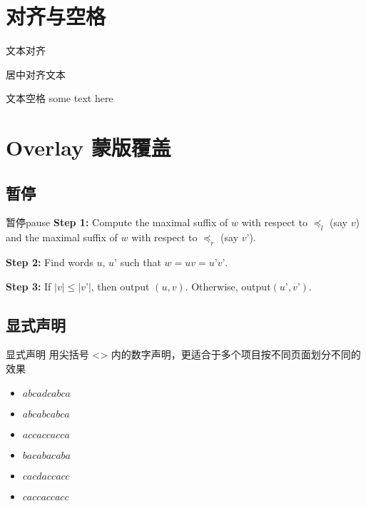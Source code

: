 \documentclass[UTF8,14pt,aspectratio=43,dvipsnames,svgnames,x11names,hyperref={urlcolor=blue}]{beamer}
\begin{document}
\section[对齐与空格]{对齐与空格}
\begin{frame}{文本对齐}
	\begin{center}  %
		居中对齐文本
	\end{center}
\end{frame}

\begin{frame}{文本空格}
	some \hskip20pt text here  %
\end{frame}

\section[Overlay 蒙板覆盖]{Overlay 蒙版覆盖}
\subsection[暂停]{暂停}
\begin{frame}{暂停}{pause}
	\textbf{Step 1:} Compute the maximal suffix of $w$
	with respect to $\preceq_l$ (say $v$) and the
	maximal suffix of $w$ with respect to $\preceq_r$
	(say $v’$).\\
	
	\pause
	
	\textbf{Step 2:} Find words $u$, $u’$ such that
	$w = uv = u’v’$.\\
	
	\pause
	
	\textbf{Step 3:} If $|v| \le |v’|$, then output
	$(u,v)$. Otherwise, output$(u’,v’)$.
\end{frame}

\subsection[显式声明]{显式声明}
\begin{frame}{显式声明}
	用尖括号 <> 内的数字声明，更适合于多个项目按不同页面划分不同的效果
	\begin{itemize}[<+->]  %
		\item<1> $abcadcabca$\\
		\item<1-2> $abcabcabca$\\
		\item<1-2> $accaccacca$\\
		\item<1> $bacabacaba$\\
		\item<1,3> $cacdaccacc$\\
		\item<1-2> $caccaccacc$
	\end{itemize}
\end{frame}
\end{document}
